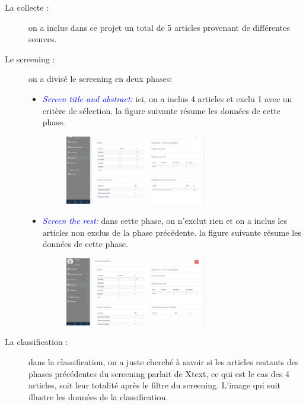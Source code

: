 \begin{description}
    \item[La collecte :] on a inclus dans ce projet un total de 5 articles provenant de différentes sources.
    
    \item[Le screening :] on a divisé le screening en deux phases:
                        \begin{itemize}
                            \item \textcolor{blue}{{\textit{Screen title and abstract:}}} ici, on a inclus 4 articles et exclu 1 avec un critère de sélection. la figure suivante résume les données de cette phase.
     \begin{figure}[H]
        \centering
        \includegraphics[width=0.65\textwidth]{resources/images/Screen title and abstract.PNG}
    \end{figure}
\newpage
                            \item \textcolor{blue}{{\textit{Screen the rest:}}} dans cette phase, on n'exclut rien et on a inclus les articles non exclus de la phase précédente. la figure suivante résume les données de cette phase.
     \begin{figure}[H]
        \centering
        \includegraphics[width=0.65\textwidth]{resources/images/Screen the rest.PNG}
    \end{figure}
                        \end{itemize}            
        \item[La classification :] dans la classification, on a juste cherché à savoir si les articles restants des phases précédentes du screening parlait de Xtext, ce qui est le cas des 4 articles, soit leur totalité après le filtre du screening. L'image qui suit illustre les données de la classification.

\end{description}
